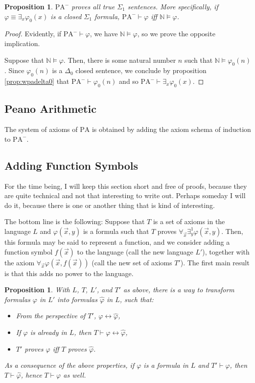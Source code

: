 \documentclass{article}
\newtheorem{prop}[theorem]{Proposition}
\theoremstyle{nonumberplain}
\newtheorem{proof}{Proof}
\newcommand{\N}{\mathbb{N}}
\newcommand{\PA}{\mathrm{PA}}
\newcommand{\WPA}{\PA^-}
\begin{document}
\begin{prop}\label{prop:wpasigma1}
$\WPA$ proves all true $\Sigma_1$ sentences. More specifically, if $\varphi \equiv \exists_x \varphi_0(x)$ is a closed $\Sigma_1$ formula, $\WPA \vdash \varphi$ iff $\N \vDash \varphi$.
\end{prop}

\begin{proof}
Evidently, if $\WPA \vdash \varphi$, we have $\N \vDash \varphi$, so we prove the opposite implication.

Suppose that $\N \vDash \varphi$. Then, there is some natural number $n$ such that $\N \vDash \varphi_0(n)$. Since $\varphi_0(n)$ is a $\Delta_0$ closed sentence, we conclude by proposition \ref{prop:wpadelta0} that $\WPA \vdash \varphi_0(n)$ and so $\WPA \vdash \exists_x \varphi_0(x)$.
\end{proof}

\subsection{Peano Arithmetic}

The system of axioms of $\PA$ is obtained by adding the axiom schema of induction to $\WPA$.

\subsection{Adding Function Symbols}

For the time being, I will keep this section short and free of proofs, because they are quite technical and not that interesting to write out. Perhaps someday I will do it, because there is one or another thing that is kind of interesting.

The bottom line is the following: Suppose that $T$ is a set of axioms in the language $L$ and $\varphi(\vec x,y)$ is a formula such that $T$ proves $\forall_{\vec x} \exists^1_y \varphi(\vec x, y)$. Then, this formula may be said to represent a function, and we consider adding a function symbol $f(\vec x)$ to the language (call the new language $L'$), together with the axiom $\forall_{\vec x} \varphi(\vec x, f(\vec x))$ (call the new set of axioms $T'$). The first main result is that this adds no power to the language.

\begin{prop}\label{prop:cons1}
With $L$, $T$, $L'$, and $T'$ as above, there is a way to transform formulas $\varphi$ in $L'$ into formulas $\hat\varphi$ in $L$, such that:
\begin{itemize}
\item From the perspective of $T'$, $\varphi \leftrightarrow \hat\varphi$,
\item If $\varphi$ is already in $L$, then $T \vdash \varphi \leftrightarrow \hat\varphi$,
\item $T'$ proves $\varphi$ iff $T$ proves $\hat\varphi$.
\end{itemize}

As a consequence of the above properties, if $\varphi$ is a formula in $L$ and $T' \vdash \varphi$, then $T \vdash \hat\varphi$, hence $T \vdash \varphi$ as well.
\end{prop}
\end{document}
